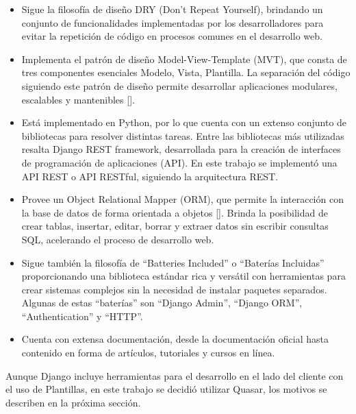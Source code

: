 \begin{itemize}
    \item Sigue la filosofía
    de diseño DRY (Don't Repeat Yourself), brindando un conjunto de funcionalidades implementadas
    por los desarrolladores para evitar la repetición de código en procesos
    comunes en el desarrollo web.
    \item Implementa el patrón de diseño Model-View-Template (MVT), que
    consta de tres componentes esenciales Modelo, Vista,
    Plantilla. La separación del código siguiendo este patrón
    de diseño permite desarrollar aplicaciones modulares, escalables y mantenibles [\cite{mvc}].
    \item Está implementado en Python, por lo que cuenta con un 
    extenso conjunto de bibliotecas para resolver distintas tareas. Entre
    las bibliotecas más utilizadas resalta Django REST framework, desarrollada 
    para la creación de interfaces de programación de aplicaciones (API).
    En este trabajo se implementó una API REST o API RESTful, siguiendo la arquitectura REST.

    \item Provee un Object Relational Mapper (ORM), 
    que permite la interacción con la base de datos
    de forma orientada a objetos [\cite{django_orm}]. Brinda la posibilidad de crear tablas, insertar,
    editar, borrar y extraer datos sin escribir consultas SQL, acelerando el proceso
    de desarrollo web. 
    \item Sigue también la filosofía de ``Batteries Included'' o ``Baterías Incluidas''
    proporcionando una biblioteca estándar rica y versátil con herramientas para
    crear sistemas complejos sin la necesidad de instalar paquetes separados. Algunas de 
    estas ``baterías'' son ``Django Admin'', ``Django ORM'', ``Authentication'' y
    ``HTTP''.
    \item Cuenta con extensa documentación, desde la documentación oficial hasta 
    contenido en forma de artículos, tutoriales y cursos en línea.

\end{itemize}

Aunque Django incluye herramientas para el desarrollo en el lado del cliente con el uso 
de Plantillas, en este trabajo se decidió utilizar Quasar, los motivos se describen en la próxima sección.


